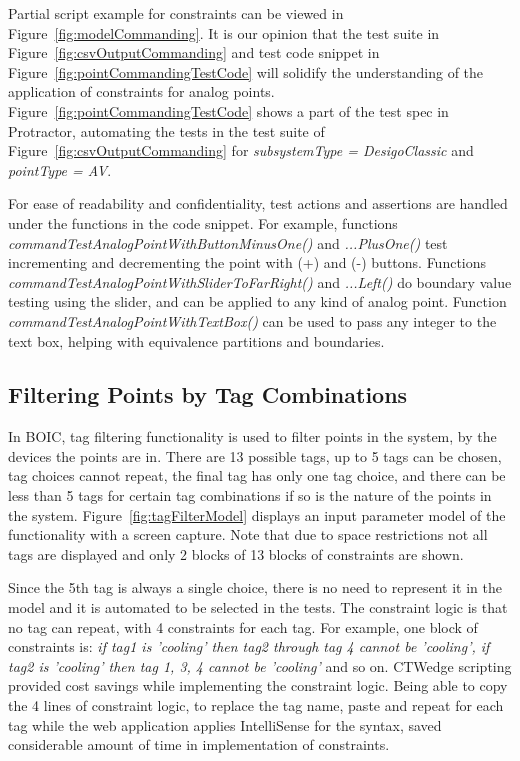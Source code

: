 \documentclass[conference]{IEEEtran}
\begin{document}
	Partial script example for constraints can be viewed in Figure~\ref{fig:modelCommanding}. 
	It is our opinion that the test suite in Figure~\ref{fig:csvOutputCommanding} and test code snippet in Figure~\ref{fig:pointCommandingTestCode} will solidify the understanding of the application of constraints for analog points.
	Figure~\ref{fig:pointCommandingTestCode} shows a part of the test spec in Protractor, automating the tests in the test suite of Figure~\ref{fig:csvOutputCommanding} for \textit{subsystemType = DesigoClassic} and \textit{pointType = AV}.
	
	For ease of readability and confidentiality, test actions and assertions are handled under the functions in the code snippet. 
	For example, functions \textit{commandTestAnalogPointWithButtonMinusOne()} and \textit{...PlusOne()} test incrementing and decrementing the point with (+) and (-) buttons.
	Functions \textit{commandTestAnalogPointWithSliderToFarRight()} and \textit{...Left()} do boundary value testing using the slider, and can be applied to any kind of analog point.
	Function \textit{commandTestAnalogPointWithTextBox()} can be used to pass any integer to the text box, helping with equivalence partitions and boundaries.

	\subsection{Filtering Points by Tag Combinations }

	In BOIC, tag filtering functionality is used to filter points in the system, by the devices the points are in.
	There are 13 possible tags, up to 5 tags can be chosen, tag choices cannot repeat, the final tag has only one tag choice, and there can be less than 5 tags for certain tag combinations if so is the nature of the points in the system.
	Figure~\ref{fig:tagFilterModel} displays an input parameter model of the functionality with a screen capture. 
	Note that due to space restrictions not all tags are displayed and only 2 blocks of 13 blocks of constraints are shown.
	
	Since the 5th tag is always a single choice, there is no need to represent it in the model and it is automated to be selected in the tests.
	The constraint logic is that no tag can repeat, with 4 constraints for each tag.
	For example, one block of constraints is: \textit{if tag1 is 'cooling' then tag2 through tag 4 cannot be 'cooling', if tag2 is 'cooling' then tag 1, 3, 4 cannot be 'cooling'} and so on.
	CTWedge scripting provided cost savings while implementing the constraint logic. 
	Being able to copy the 4 lines of constraint logic, to replace the tag name, paste and repeat for each tag while the web application applies IntelliSense for the syntax, saved considerable amount of time in implementation of constraints.
\end{document}
